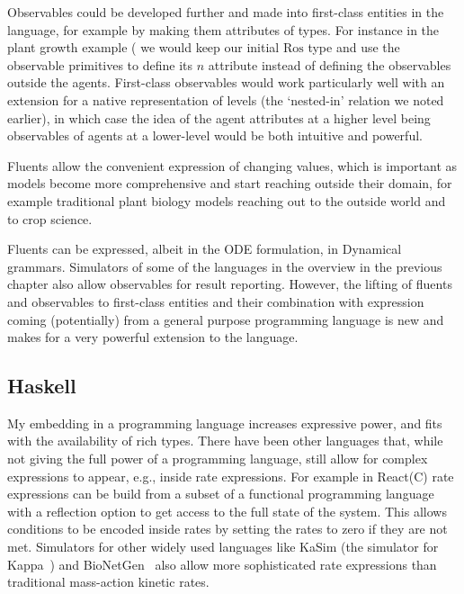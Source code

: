 Observables could be developed further and made into first-class entities in the
language, for example by making them attributes of types. For instance in the
plant growth example ( we would keep our initial $\mathrm{Ros}$
type and use the observable primitives to define its $n$ attribute instead of
defining the observables outside the agents. First-class observables would work
particularly well with an extension for a native representation of levels (the
`nested-in' relation we noted earlier), in which case the idea of the agent
attributes at a higher level being observables of agents at a lower-level would
be both intuitive and powerful.

Fluents allow the convenient expression of changing values, which is
important as models become more comprehensive and start reaching outside their
domain, for example traditional plant biology models reaching out to the outside
world and to crop science.

Fluents can be expressed, albeit in the ODE formulation, in Dynamical
grammars. Simulators of some of the languages in the overview in the previous
chapter also allow observables for result reporting. However, the lifting of
fluents and observables to first-class entities and their combination with
expression coming (potentially) from a general purpose programming language is
new and makes for a very powerful extension to the language.


\subsection{Haskell}
My embedding in a programming language increases expressive power, and fits
with the availability of rich types.  There have been other languages that,
while not giving the full power of a programming language, still allow for
complex expressions to appear, e.g., inside rate expressions. For example in
React(C) \citep{john_biochemical_2011} rate expressions can be build from a
subset of a functional programming language with a reflection option to get
access to the full state of the system. This allows conditions to be encoded
inside rates by setting the rates to zero if they are not met. Simulators for
other widely used languages like KaSim (the simulator for
Kappa~\citep{danos_rule-based_2008}) and
BioNetGen~\citep{blinov_bionetgen:_2004} also allow more sophisticated rate
expressions than traditional mass-action kinetic rates.

